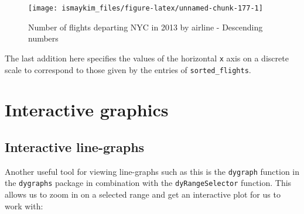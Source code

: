 \documentclass[]{tufte-book}
\newenvironment{Shaded}{\begin{snugshade}}{\end{snugshade}}
\newcommand{\KeywordTok}[1]{\textcolor[rgb]{0.13,0.29,0.53}{\textbf{{#1}}}}
\newcommand{\DataTypeTok}[1]{\textcolor[rgb]{0.13,0.29,0.53}{{#1}}}
\newcommand{\StringTok}[1]{\textcolor[rgb]{0.31,0.60,0.02}{{#1}}}
\newcommand{\OtherTok}[1]{\textcolor[rgb]{0.56,0.35,0.01}{{#1}}}
\newcommand{\NormalTok}[1]{{#1}}
\begin{document}
\begin{figure}

{\centering \texttt{[image: ismaykim\_files/figure-latex/unnamed-chunk-177-1]} 

}

\caption[Number of flights departing NYC in 2013 by airline - Descending numbers]{Number of flights departing NYC in 2013 by airline - Descending numbers}\label{fig:unnamed-chunk-177}
\end{figure}

The last addition here specifies the values of the horizontal \texttt{x}
axis on a discrete scale to correspond to those given by the entries of
\texttt{sorted\_flights}.

\section{Interactive graphics}\label{interactive-graphics}

\subsection{Interactive line-graphs}\label{interactive-line-graphs}

Another useful tool for viewing line-graphs such as this is the
\texttt{dygraph} function in the \texttt{dygraphs} package in
combination with the \texttt{dyRangeSelector} function. This allows us
to zoom in on a selected range and get an interactive plot for us to
work with:

\begin{Shaded}
\end{Shaded}
\end{document}
